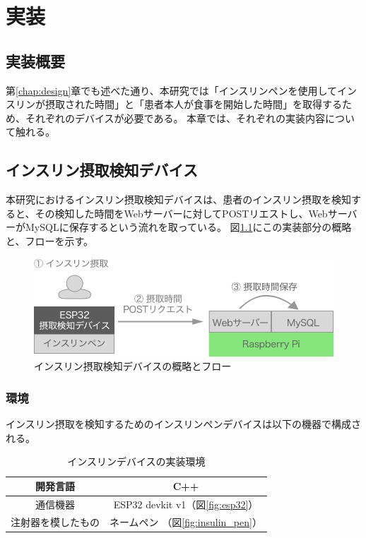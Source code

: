 \chapter{実装}
\label{chap:implementation}

\section{実装概要}

第\ref{chap:design}章でも述べた通り、本研究では「インスリンペンを使用してインスリンが摂取された時間」と「患者本人が食事を開始した時間」を取得するため、それぞれのデバイスが必要である。
本章では、それぞれの実装内容について触れる。

\section{インスリン摂取検知デバイス}
\label{section:insulin_pen_device}

本研究におけるインスリン摂取検知デバイスは、患者のインスリン摂取を検知すると、その検知した時間をWebサーバーに対してPOSTリエストし、WebサーバーがMySQLに保存するという流れを取っている。
図\ref{fig:insulin_injection_flow}にこの実装部分の概略と、フローを示す。

\begin{figure}[htbp]
  \caption{インスリン摂取検知デバイスの概略とフロー}
  \label{fig:insulin_injection_flow}
  \begin{center}
    \includegraphics[bb=0 0 1000 270,width=18cm]{assets/insulin_injection_flow.png}
  \end{center}
\end{figure}

\subsection{環境}

インスリン摂取を検知するためのインスリンペンデバイスは以下の機器で構成される。

\begin{table}[htbp]
  \caption{インスリンデバイスの実装環境}
  \label{tb:insulin-device}
  \begin{center}
    \begin{tabular}{|c||c|}
      \hline
      開発言語  & C++ \\\hline
      通信機器  & ESP32 devkit v1（図\ref{fig:esp32}） \\\hline
      注射器を模したもの & ネームペン （図\ref{fig:insulin_pen}）\\\hline
    \end{tabular}
  \end{center}
\end{table}

